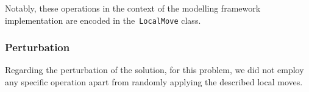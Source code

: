 Notably, these operations in the context of the modelling framework
implementation are encoded in the~\texttt{LocalMove} class.

\subsubsection*{Perturbation}

Regarding the perturbation of the solution, for this problem, we did not employ
any specific operation apart from randomly applying the described local moves.